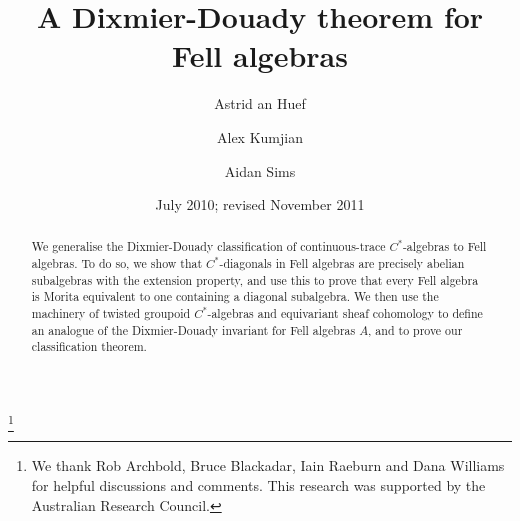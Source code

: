 \documentclass[12pt,a4paper]{amsart}
\begin{document}
\newtheorem{thm}{Theorem}[section]
\newtheorem{cor}[thm]{Corollary}
\newtheorem{posscor}[thm]{Possible Corollary}
\newtheorem{lemma}[thm]{Lemma}
\newtheorem{prop}[thm]{Proposition}
\newtheorem{goal}[thm]{Goal}
\newtheorem{conj}[thm]{Conjecture}
\newtheorem{notetoselves}[thm]{Note to selves}
\newtheorem{thm1}{Theorem}
\theoremstyle{definition}
\newtheorem{defn}[thm]{Definition}
\newtheorem{remark}[thm]{Remark}
\newtheorem{example}[thm]{Example}
\newtheorem{remarks}[thm]{Remarks}
\newtheorem{claim}[thm]{Claim}
\newtheorem{fact}[thm]{Fact}
\newtheorem{wish}[thm]{Wish}
\newtheorem{notation+h}[thm]{Notation}
\def\range{\operatorname{range}}


\title[A Dixmier-Douady theorem for Fell algebras]
{A Dixmier-Douady theorem for Fell algebras}

\author[an Huef]{Astrid an Huef}
\address{Department of Mathematics and Statistics\\
University of Otago\\
Dunedin 9054\\
New Zealand} 

\author[Kumjian]{Alex Kumjian}
\address{Department of Mathematics\\
University of Nevada \\
Reno, NV 89557\\
USA} 

\author[Sims]{Aidan Sims}
\address{School of Mathematics and Applied Statistics\\
University of Wollongong \\
NSW 2522\\
Australia} 



\thanks{We thank Rob Archbold, Bruce Blackadar, Iain Raeburn and Dana Williams
for helpful discussions and comments. This research was supported by the Australian Research
Council.}


\date{July 2010; revised November 2011}

\begin{abstract}
We generalise the Dixmier-Douady classification of
continuous-trace $C^*$-algebras to Fell algebras. To do so, we
show that $C^*$-diagonals in Fell algebras are precisely
abelian subalgebras with the extension property, and use this
to prove that every Fell algebra is Morita equivalent to one
containing a diagonal subalgebra. We then use the machinery of
twisted groupoid $C^*$-algebras and equivariant sheaf
cohomology to define an analogue of the Dixmier-Douady
invariant for Fell algebras $A$, and to prove our
classification theorem.
\end{abstract}
\end{document}
